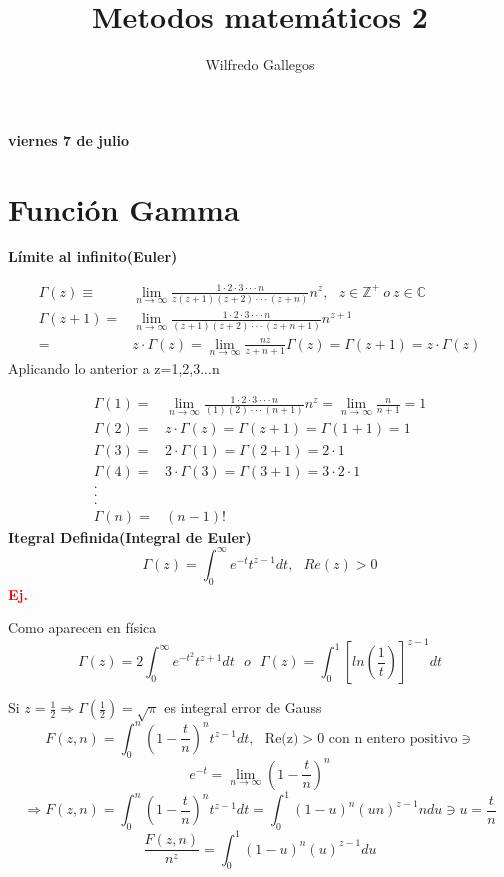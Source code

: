 \documentclass{article}
\title{Metodos matemáticos 2}
\author{Wilfredo Gallegos}
\theoremstyle{definition}
\begin{document}
\maketitle

\textbf{viernes 7 de julio}
\section{Función Gamma}
\textbf{Límite al infinito(Euler)}

\[\begin{array}{rl}
	\Gamma (z)\equiv & \lim\limits_{n\to \infty} \frac{1\cdot 2\cdot 3\cdot\cdot\cdot n}{z(z+1)(z+2)\cdot\cdot\cdot (z+n)}n^z,\ \ \ z\in\mathbb{Z}^{+}\ o\ z\in\mathbb{C}\\
	\Gamma(z+1)=& \lim\limits_{n\to \infty} \frac{1\cdot 2\cdot 3\cdot\cdot\cdot n}{(z+1)(z+2)\cdot\cdot\cdot (z+n+1)}n^{z+1}\\
	=& z\cdot\Gamma (z)= \lim\limits_{n\to \infty}\frac{nz}{z+n+1}\Gamma (z)=\Gamma (z+1)=z\cdot\Gamma (z)
\end{array}\]
Aplicando lo anterior a z=1,2,3...n

\[\begin{array}{rl}

	\Gamma (1)=& \lim\limits_{n\to \infty} \frac{1\cdot 2\cdot 3\cdot\cdot\cdot n}{(1)(2)\cdot\cdot\cdot (n+1)}n^z= \lim\limits_{n\to \infty}\frac{n}{n+1}=1\\
	\Gamma (2)=& z\cdot \Gamma (z)= \Gamma (z+1)=\Gamma (1+1)=1\\
	\Gamma (3)=& 2\cdot \Gamma (1)= \Gamma (2+1)=2\cdot 1\\
	\Gamma (4)=& 3\cdot \Gamma (3)= \Gamma (3+1)=3\cdot 2\cdot 1\\
	.\\
	.\\
	.\\
	\Gamma (n)=&(n-1)!

\end{array}\]
\textbf{Itegral Definida(Integral de Euler)}
\[\Gamma (z)=\int^{\infty}_0 e^{-t}t^{z-1}dt,\ \ \ Re(z)>0\]
\textbf{\textcolor{red}{Ej.}} 

Como aparecen en física
\[\Gamma (z)= 2\int^{\infty}_0 e^{-t^2}t^{z+1}dt\ \ \ o \ \ \ \Gamma (z) = \int^1_0\left[ln(\frac{1}{t})\right]^{z-1}dt\]

Si $z=\frac{1}{2}\Rightarrow \Gamma (\frac{1}{2}) = \sqrt{\pi}$ es integral error de Gauss
\[F(z,n)=\int^n_0\left(1-\frac{t}{n}\right)^nt^{z-1}dt,\ \ \ \text{Re(z)}>\text{0 con n entero positivo}\ni\]
\[e^{-t}=\lim\limits_{n\to \infty}\left(1-\frac{t}{n}\right)^n\]
\[\Rightarrow F(z,n)=\int^n_0\left(1-\frac{t}{n}\right)^nt^{z-1}dt = \int^1_0 (1-u)^n(un)^{z-1}ndu\ni u=\frac{t}{n}\]
\[\frac{F(z,n)}{n^z}=\int^1_0 (1-u)^n(u)^{z-1}du\]
\end{document}
